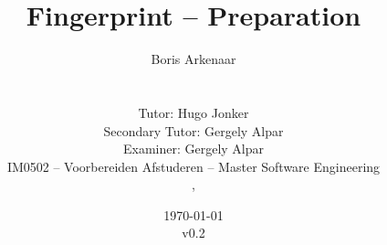 \title{Fingerprint -- Preparation}
\author{
  \alignauthor
  Boris Arkenaar\\
  \\
  \\
  Tutor: Hugo Jonker\\
  Secondary Tutor: Gergely Alpar\\
  Examiner: Gergely Alpar\\
  IM0502 -- Voorbereiden Afstuderen -- Master Software Engineering\\
  ,\\
  }
\date{\today\\v0.2}
\maketitle
